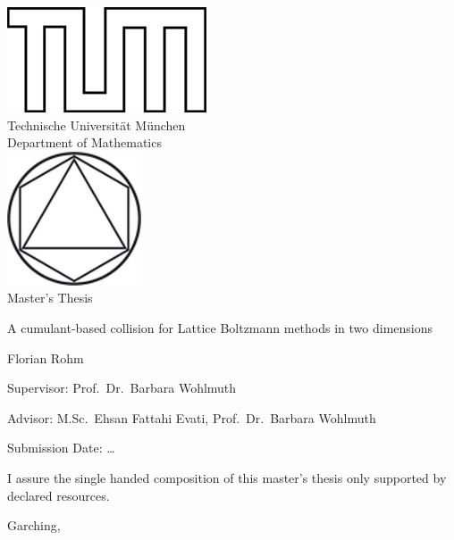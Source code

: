 \documentclass[12pt,a4paper,twoside]{article}
\begin{document}
\pagestyle{empty}
\begin{titlepage}
\begin{center}
\includegraphics{TUMlschwarz.png}\\[3mm]
\sf
{\Large
  Technische Universit\"at M\"unchen\\[5mm]
  Department of Mathematics\\[8mm]
}
\normalsize
\includegraphics{TUMlMschwarz.png}\\[15mm]

Master's Thesis\\[15mm]

{\begin{spacing}{1.0}
\Huge
  A cumulant-based collision for Lattice Boltzmann methods in two dimensions
\end{spacing}
}
\bigskip

\normalsize

Florian Rohm
\end{center}
\vspace*{75mm}

Supervisor: Prof.\ Dr.\ Barbara Wohlmuth

\medskip

Advisor: M.Sc.\ Ehsan Fattahi Evati, Prof.\ Dr.\ Barbara Wohlmuth
\medskip

Submission Date: \ldots

\end{titlepage}

\vspace*{150mm}

I assure the single handed composition of this master's thesis only supported by declared resources.
\bigskip

Garching,
\newpage
\end{document}
